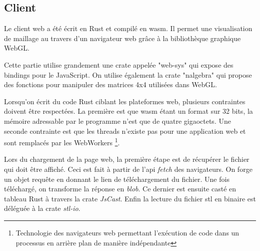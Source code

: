 \subsection{Client}

Le client web a été écrit en Rust et compilé en \gls{wasm}.
Il permet une visualisation de maillage au travers d'un navigateur web grâce à
la bibliothèque graphique WebGL.

Cette partie utilise grandement une crate appelée "web-sys" qui expose des bindings pour le JavaScript.
On utilise également la crate "nalgebra" qui propose des fonctions pour manipuler des matrices 4x4 utilisées dans WebGL.

Lorsqu'on écrit du code Rust ciblant les plateformes web, plusieurs contraintes
doivent être respectées. La première est que \gls{wasm} étant un format sur 32
bits, la mémoire adressable par le programme n'est que de quatre gigaoctets. Une
seconde contrainte est que les threads n'existe pas pour une application web
et sont remplacés par les WebWorkers
\footnote{Technologie des navigateurs web permettant l'exécution de
code dans un processus en arrière plan de manière indépendante}.

Lors du chargement de la page web, la première étape est de récupérer le fichier
qui doit être affiché.
Ceci est fait à partir de l'\gls{api} \textit{fetch} des
navigateurs. On forge un objet requête en donnant le lien de téléchargement du
fichier. Une fois téléchargé, on transforme la réponse en \textit{blob}.
Ce dernier est ensuite casté en tableau Rust à travers la crate \textit{JsCast}.
Enfin la lecture du fichier \gls{stl} en binaire est déléguée à la crate \textit{stl-io}.

